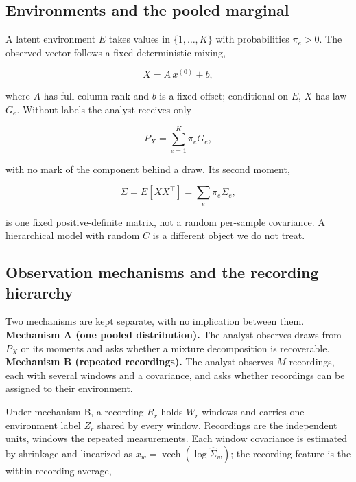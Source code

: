 \subsection{Environments and the pooled
marginal}\label{environments-and-the-pooled-marginal}

A latent environment \(E\) takes values in \(\{1,\dots,K\}\) with
probabilities \(\pi_e>0\). The observed vector follows a fixed
deterministic mixing,

\begin{equation}\label{eq:obs-model}
X=A\,x^{(0)}+b,
\end{equation}

where \(A\) has full column rank and \(b\) is a fixed offset;
conditional on \(E\), \(X\) has law \(G_e\). Without labels the analyst
receives only

\begin{equation}\label{eq:pool-mixture}
P_X=\sum_{e=1}^K \pi_e G_e,
\end{equation}

with no mark of the component behind a draw. Its second moment,

\begin{equation}\label{eq:pool-cov}
\bar\Sigma=E[XX^\top]=\sum_e\pi_e\Sigma_e,
\end{equation}

is one fixed positive-definite matrix, not a random per-sample
covariance. A hierarchical model with random \(C\) is a different object
we do not treat.

\subsection{Observation mechanisms and the recording
hierarchy}\label{observation-mechanisms-and-the-recording-hierarchy}

Two mechanisms are kept separate, with no implication between them.
\textbf{Mechanism A (one pooled distribution).} The analyst observes
draws from \(P_X\) or its moments and asks whether a mixture
decomposition is recoverable. \textbf{Mechanism B (repeated
recordings).} The analyst observes \(M\) recordings, each with several
windows and a covariance, and asks whether recordings can be assigned to
their environment.

Under mechanism B, a recording \(R_r\) holds \(W_r\) windows and carries
one environment label \(Z_r\) shared by every window. Recordings are the
independent units, windows the repeated measurements. Each window
covariance is estimated by shrinkage and linearized as
\(x_w=\operatorname{vech}(\log\widehat\Sigma_w)\); the recording feature
is the within-recording average,

